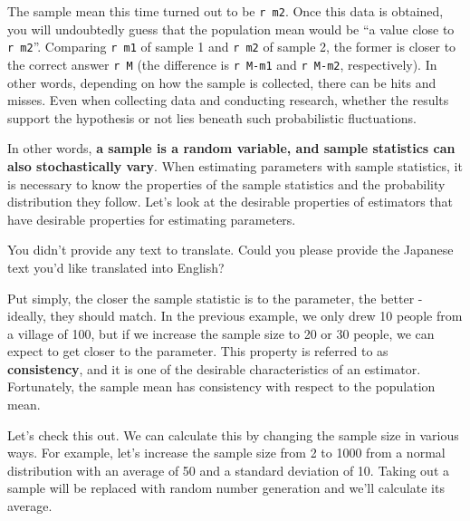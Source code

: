 \documentclass[
  a4paper,
]{book}
\begin{document}
The sample mean this time turned out to be \texttt{r\ m2}. Once this
data is obtained, you will undoubtedly guess that the population mean
would be ``a value close to \texttt{r\ m2}''. Comparing \texttt{r\ m1}
of sample 1 and \texttt{r\ m2} of sample 2, the former is closer to the
correct answer \texttt{r\ M} (the difference is \texttt{r\ M-m1} and
\texttt{r\ M-m2}, respectively). In other words, depending on how the
sample is collected, there can be hits and misses. Even when collecting
data and conducting research, whether the results support the hypothesis
or not lies beneath such probabilistic fluctuations.

In other words, \textbf{a sample is a random variable, and sample
statistics can also stochastically vary}. When estimating parameters
with sample statistics, it is necessary to know the properties of the
sample statistics and the probability distribution they follow. Let's
look at the desirable properties of estimators that have desirable
properties for estimating parameters.

You didn't provide any text to translate. Could you please provide the
Japanese text you'd like translated into English?

Put simply, the closer the sample statistic is to the parameter, the
better - ideally, they should match. In the previous example, we only
drew 10 people from a village of 100, but if we increase the sample size
to 20 or 30 people, we can expect to get closer to the parameter. This
property is referred to as \textbf{consistency}, and it is one of the
desirable characteristics of an estimator. Fortunately, the sample mean
has consistency with respect to the population mean.

Let's check this out. We can calculate this by changing the sample size
in various ways. For example, let's increase the sample size from 2 to
1000 from a normal distribution with an average of 50 and a standard
deviation of 10. Taking out a sample will be replaced with random number
generation and we'll calculate its average.
\end{document}
